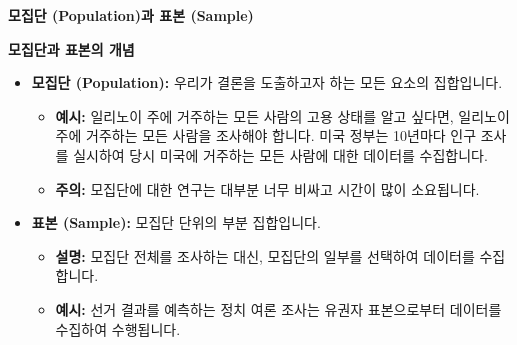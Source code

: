 \documentclass[11pt,a4paper]{book}
\providecommand{\captionof}[2]{\textbf{#2}}
\theoremstyle{definition}
\begin{document}
\begin{tcolorbox}[title={데이터 세트의 구성 요소 (What Is In The Data Set?)}]
\textbf{모집단 (Population)과 표본 (Sample)}

\begin{center}
\captionof{figure}{모집단과 표본의 개념}
\label{fig:population_sample}
\end{center}

\begin{itemize}
    \item \textbf{모집단 (Population):} 우리가 결론을 도출하고자 하는 모든 요소의 집합입니다.
    \begin{itemize}
        \item \textbf{예시:} 일리노이 주에 거주하는 모든 사람의 고용 상태를 알고 싶다면, 일리노이 주에 거주하는 모든 사람을 조사해야 합니다. 미국 정부는 10년마다 인구 조사를 실시하여 당시 미국에 거주하는 모든 사람에 대한 데이터를 수집합니다.
        \item \textbf{주의:} 모집단에 대한 연구는 대부분 너무 비싸고 시간이 많이 소요됩니다.
    \end{itemize}
    \item \textbf{표본 (Sample):} 모집단 단위의 부분 집합입니다.
    \begin{itemize}
        \item \textbf{설명:} 모집단 전체를 조사하는 대신, 모집단의 일부를 선택하여 데이터를 수집합니다.
        \item \textbf{예시:} 선거 결과를 예측하는 정치 여론 조사는 유권자 표본으로부터 데이터를 수집하여 수행됩니다.
    \end{itemize}
\end{itemize}
\end{tcolorbox}
\end{document}
